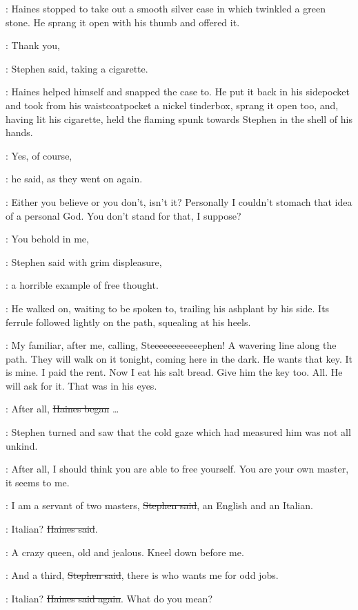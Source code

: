 :
Haines stopped to take out a smooth silver case
in which twinkled a green stone.
He sprang it open with his thumb and offered it.

\Stephen:
Thank you,

:
Stephen said,
taking a cigarette.

:
Haines helped himself and snapped the case to.
He put it back in his sidepocket
and took from his waistcoatpocket
a nickel tinderbox,
sprang it open too,
and,
having lit his cigarette,
held the flaming spunk towards Stephen
in the shell of his hands.

\Haines:
Yes, of course,

:
he said, as they went on again.

\Haines:
Either you believe or you don't, isn't it?
Personally I couldn't stomach that idea of a personal God.
You don't stand for that, I suppose?

\Stephen:
You behold in me,

:
Stephen said with grim displeasure,

\Stephen:
a horrible example of free thought.

:
He walked on,
waiting to be spoken to,
trailing his ashplant by his side.
Its ferrule followed lightly on the path,
squealing at his heels.

\StephenInt:
My familiar, after me,
calling, Steeeeeeeeeeeephen!
A wavering line along the path.
They will walk on it tonight,
coming here in the dark.
He wants that key.
It is mine.
I paid the rent.
Now I eat his salt bread.
Give him the key too.
All.
He will ask for it.
That was in his eyes.

\Haines:
After all,
\sout{Haines began} …

:
Stephen turned
and saw that the cold gaze which had measured him
was not all unkind.

\Haines:
After all,
I should think you are able to free yourself.
You are your own master,
it seems to me.

\Stephen:
I am a servant of two masters,
\sout{Stephen said},
an English and an Italian.

\Haines:
Italian?
\sout{Haines said}.

\StephenInt:
A crazy queen, old and jealous.
Kneel down before me.

\Stephen:
And a third,
\sout{Stephen said},
there is who wants me for odd jobs.

\Haines:
Italian?
\sout{Haines said again}.
What do you mean?


